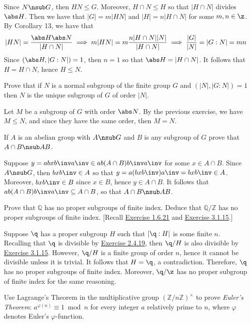 \begin{problems}
\begin{sol}
        Since $N \nsub G$, then $HN \leq G$. Moreover, $H \cap N \leq H$ so that $|H \cap N|$ divides $\abs H$. Then we have that $|G| = m|HN|$ and $|H| = n|H \cap N|$ for some $m, n \in \z$. By Corollary 13, we have that
        \[|HN| = \frac{\abs H \abs N}{|H \cap N|} \implies m|HN| = m\frac{n|H \cap N||N|}{|H \cap N|} \implies \frac{|G|}{|N|} = |G : N| = mn\]
        Since $(\abs H, |G : N|) = 1$, then $n = 1$ so that $\abs H = |H \cap N|$. It follows that $H = H \cap N$, hence $H \leq N$.
    \end{sol}
    \item Prove that if $N$ is a normal subgroup of the finite group $G$ and $(|N|, |G : N|) = 1$ then $N$ is the unique subgroup of $G$ of order $|N|$.
    \begin{sol}
        Let $M$ be a subgroup of $G$ with order $\abs N$. By the previous exercise, we have $M \leq N$, and since they have the same order, then $M = N$.
    \end{sol}
    \item If $A$ is an abelian group with $A \nsub G$ and $B$ is any subgroup of $G$ prove that $A \cap B \nsub AB$.
    \begin{sol}
        Suppose $y = abxb\inv a\inv \in ab(A \cap B)b\inv a\inv$ for some $x \in A \cap B$. Since $A \nsub G$, then $bxb\inv \in A$ so that $y = a(bxb\inv)a\inv = bxb\inv \in A$. Moreover, $bxb\inv \in B$ since $x \in B$, hence $y \in A \cap B$. It follows that $ab(A \cap B)b\inv a\inv \subseteq A \cap B$, so that $A \cap B \nsub AB$.
    \end{sol}
    \item Prove that $\mathbb{Q}$ has no proper subgroups of finite index. Deduce that $\mathbb{Q}/\mathbb{Z}$ has no proper subgroups of finite index. [Recall \hyperref[ex1.6.21]{Exercise 1.6.21} and \hyperref[ex3.1.15]{Exercise 3.1.15}.]
    \begin{sol}
        Suppose $\q$ has a proper subgroup $H$ such that $|\q : H|$ is some finite $n$. Recalling that $\q$ is divisible by \hyperref[ex2.4.19]{Exercise 2.4.19}, then $\q/H$ is also divisible by \hyperref[ex3.1.15]{Exercise 3.1.15}. However, $\q/H$ is a finite group of order $n$, hence it cannot be divisible unless it is trivial. It follows that $H = \q$, a contradiction. Therefore, $\q$ has no proper subgroups of finite index. Moreover, $\q/\z$ has no proper subgroup of finite index for the same reasoning.
    \end{sol}
    \item Use Lagrange's Theorem in the multiplicative group $(\mathbb{Z}/n\mathbb{Z})^\times$ to prove \textit{Euler's Theorem}: $a^{\varphi(n)} \equiv 1 \bmod n$ for every integer $a$ relatively prime to $n$, where $\varphi$ denotes Euler's $\varphi$-function.

\end{problems}
